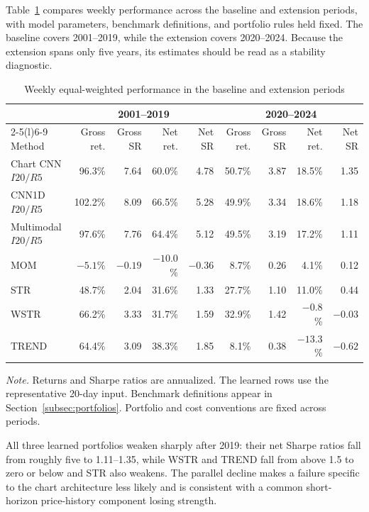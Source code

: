 Table~\ref{tab:period_results} compares weekly performance across the baseline and extension periods, with model parameters, benchmark definitions, and portfolio rules held fixed. The baseline covers 2001--2019, while the extension covers 2020--2024. Because the extension spans only five years, its estimates should be read as a stability diagnostic.

\begin{table}[htbp]
\centering
\caption{Weekly equal-weighted performance in the baseline and extension periods}
\label{tab:period_results}
\scriptsize
\setlength{\tabcolsep}{4.2pt}
\begin{tabular}{@{}lrrrrrrrr@{}}
\toprule
& \multicolumn{4}{c}{2001--2019} & \multicolumn{4}{c}{2020--2024} \\
\cmidrule(lr){2-5}\cmidrule(l){6-9}
Method & Gross ret. & Gross SR & Net ret. & Net SR & Gross ret. & Gross SR & Net ret. & Net SR \\
\midrule
Chart CNN $I20/R5$ & 96.3\% & 7.64 & 60.0\% & 4.78 & 50.7\% & 3.87 & 18.5\% & 1.35 \\
CNN1D $I20/R5$ & 102.2\% & 8.09 & 66.5\% & 5.28 & 49.9\% & 3.34 & 18.6\% & 1.18 \\
Multimodal $I20/R5$ & 97.6\% & 7.76 & 64.4\% & 5.12 & 49.5\% & 3.19 & 17.2\% & 1.11 \\
MOM & $-5.1$\% & $-0.19$ & $-10.0$\% & $-0.36$ & 8.7\% & 0.26 & 4.1\% & 0.12 \\
STR & 48.7\% & 2.04 & 31.6\% & 1.33 & 27.7\% & 1.10 & 11.0\% & 0.44 \\
WSTR & 66.2\% & 3.33 & 31.7\% & 1.59 & 32.9\% & 1.42 & $-0.8$\% & $-0.03$ \\
TREND & 64.4\% & 3.09 & 38.3\% & 1.85 & 8.1\% & 0.38 & $-13.3$\% & $-0.62$ \\
\bottomrule
\end{tabular}
\begin{minipage}{\textwidth}
\footnotesize\textit{Note.} Returns and Sharpe ratios are annualized. The learned rows use the representative 20-day input. Benchmark definitions appear in Section~\ref{subsec:portfolios}. Portfolio and cost conventions are fixed across periods.
\end{minipage}
\end{table}

\FloatBarrier

All three learned portfolios weaken sharply after 2019: their net Sharpe ratios fall from roughly five to 1.11--1.35, while WSTR and TREND fall from above 1.5 to zero or below and STR also weakens. The parallel decline makes a failure specific to the chart architecture less likely and is consistent with a common short-horizon price-history component losing strength.

